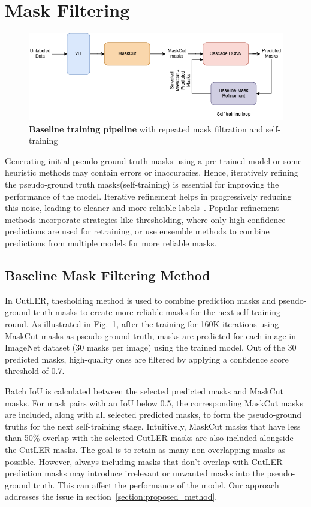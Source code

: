\section{Mask Filtering}
\begin{figure}
	\centering
	\includegraphics[width=1\textwidth]{Images/main/baseline_method.png}
	\caption[\textbf{Baseline Training Pipeline}]{\textbf{Baseline training pipeline} with repeated mask filtration and self-training}
	\label{fig:baseline_training}
\end{figure}
Generating initial pseudo-ground truth masks using a pre-trained model or some heuristic methods may contain errors or inaccuracies. Hence, iteratively refining the pseudo-ground truth masks(self-training) is essential for improving the performance of the model. Iterative refinement helps in progressively reducing this noise, leading to cleaner and more reliable labels~\cite{xie2020selftrainingnoisystudentimproves}. Popular refinement methods incorporate strategies like thresholding, where only high-confidence predictions are used for retraining, or use ensemble methods to combine predictions from multiple models for more reliable masks.

\subsection{Baseline Mask Filtering Method}
\label{sec:baseline_mask_filteration}

In CutLER, thesholding method is used to combine prediction masks and pseudo-ground truth masks to create more reliable masks for the next self-training round. As illustrated in Fig.~\ref{fig:baseline_training}, after the training for 160K iterations using MaskCut masks as pseudo-ground truth, masks are predicted for each image in ImageNet dataset (30 masks per image) using the trained model. Out of the 30 predicted masks, high-quality ones are filtered by applying a confidence score threshold of 0.7.

Batch IoU is calculated between the selected predicted masks and MaskCut masks. For mask pairs with an IoU below 0.5, the corresponding MaskCut masks are included, along with all selected predicted masks, to form the pseudo-ground truths for the next self-training stage. Intuitively, MaskCut masks that have less than 50\% overlap with the selected CutLER masks are also included alongside the CutLER masks. The goal is to retain as many non-overlapping masks as possible. However, always including masks that don't overlap with CutLER prediction masks may introduce irrelevant or unwanted masks into the pseudo-ground truth. This can affect the performance of the model. Our approach addresses the issue in section~\ref{section:proposed_method}.

